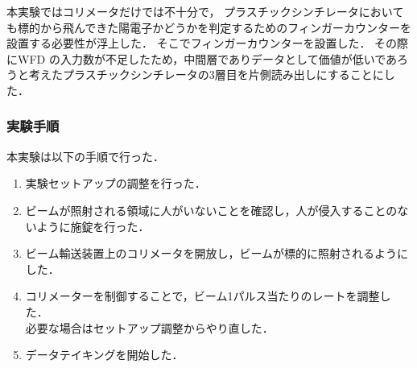 本実験ではコリメータだけでは不十分で，
プラスチックシンチレータにおいても標的から飛んできた陽電子かどうかを判定するためのフィンガーカウンターを設置する必要性が浮上した．
そこでフィンガーカウンターを設置した．
その際にWFD の入力数が不足したため，中間層でありデータとして価値が低いであろうと考えたプラスチックシンチレータの3層目を片側読み出しにすることにした．

\subsubsection{実験手順}
本実験は以下の手順で行った．
\begin{enumerate}
  \item 実験セットアップの調整を行った．
  \item ビームが照射される領域に人がいないことを確認し，人が侵入することのないように施錠を行った．
  \item ビーム輸送装置上のコリメータを開放し，ビームが標的に照射されるようにした．
  \item コリメーターを制御することで，ビーム1パルス当たりのレートを調整した．
    \\必要な場合はセットアップ調整からやり直した．
  \item データテイキングを開始した．
\end{enumerate}
%

